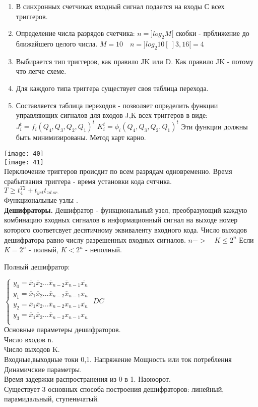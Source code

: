\begin{enumerate}
  \item В синхронных счетчиках входный сигнал подается на входы С всех триггеров.
  \item Определение числа разрядов счетчика: $n = ]log_2 M[$ скобки - прближение до ближайшего целого числа.
  $M =10 \quad n = ]log_2 10 [~]3,16[ = 4 $
  \item Выбирается тип триггеров, как правило JK или D.
  Как правило JK - потому что легче схеме.
  \item Для каждого типа триггера существует своя таблица перехода.
  \item Составляется таблица переходов - позволяет определить функции управляющих сигналов для входов J,K всех триггеров в виде:
  $ J_i^t = f_i(Q_4,Q_3,Q_2,Q_1)^t$  $ K_i^t = \phi_i(Q_4,Q_3,Q_2,Q_1)^t$
  Эти функции должны быть минимизированы. Метод карт карно.
\end{enumerate}
\texttt{[image: 40]}\\
\texttt{[image: 41]}\\
Перключение триггеров происдит по всем разрядам одновременно.
Время срабытвания триггера - время установки кода счтчика.\\
$T \geq t_4^{T2} + t_{yst} t_{zd.sr.}$\\


Функциональные узлы .\\
\textbf{Дешифраторы.}
Дешифратор - функциональный узел, преобразующий каждую комбинацию входных сигналов в информационный
сигнал на выходе номер которого соответсвует десятичному эквиваленту входного кода.
Число выходов дешифратора равно числу разрешенных входных сигналов. $ n -> \quad K \leq 2^n$ Если  $K = 2^n$ - полный,  $K < 2^n$ - неполный.

Полный дешифратор:

$\begin{cases}
  y_0 = \overline{x}_1 \overline{x}_2 ... \overline{x}_{n-2} \overline{x}_{n-1} \overline{x_n} \\
  y_1 = \overline{x}_1 \overline{x}_2 ... \overline{x}_{n-2} \overline{x}_{n-1} {x_n}\\
  y_2=  \overline{x}_1 \overline{x}_2 ... \overline{x}_{n-2} x_{n-1} \overline{x_n}\\
  y_3=  \overline{x}_1 \overline{x}_2 ... \overline{x}_{n-2} x_{n-1} {x_n} \\

\end{cases}$
$DC $\\
Основные параметеры дешифраторов.\\
Число входов n.\\
Число выходов K.\\
Входные,выходные токи 0,1.
Напряжение
Мощность или ток потребления \\

Динамичские параметры.\\
Время задержки распространения из 0 в 1. Наоюорот.\\

Существует 3 основных способа построения дешифраторов: линейный, парамидальный, ступеньчатый.

